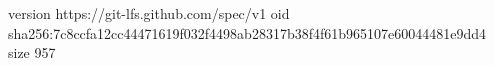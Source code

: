 version https://git-lfs.github.com/spec/v1
oid sha256:7c8ccfa12cc44471619f032f4498ab28317b38f4f61b965107e60044481e9dd4
size 957
